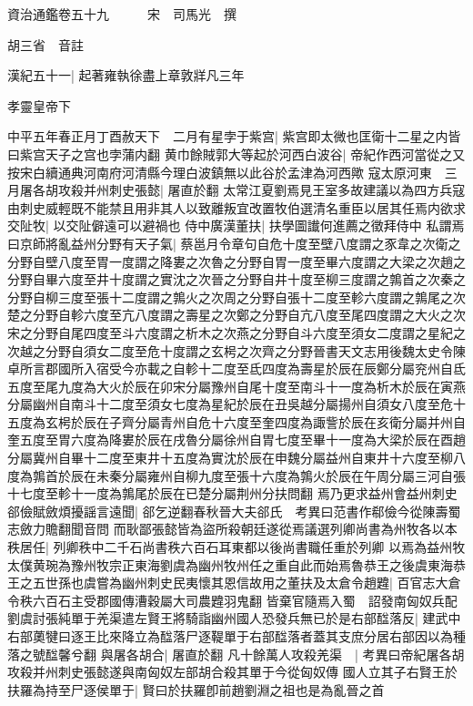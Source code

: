 資治通鑑卷五十九　　　宋　司馬光　撰

胡三省　音註

漢紀五十一|{
	起著雍執徐盡上章敦牂凡三年}


孝靈皇帝下

中平五年春正月丁酉赦天下　二月有星孛于紫宫|{
	紫宫即太微也匡衛十二星之内皆曰紫宫天子之宫也孛蒲内翻}
黄巾餘賊郭大等起於河西白波谷|{
	帝紀作西河當從之又按宋白續通典河南府河清縣今理白波鎮無以此谷於孟津為河西歟}
寇太原河東　三月屠各胡攻殺并州刺史張懿|{
	屠直於翻}
太常江夏劉焉見王室多故建議以為四方兵寇由刺史威輕既不能禁且用非其人以致離叛宜改置牧伯選清名重臣以居其任焉内欲求交阯牧|{
	以交阯僻遠可以避禍也}
侍中廣漢董扶|{
	扶學圖䜟何進薦之徵拜侍中}
私謂焉曰京師將亂益州分野有天子氣|{
	蔡邕月令章句自危十度至壁八度謂之豕韋之次衛之分野自壁八度至胃一度謂之降婁之次魯之分野自胃一度至畢六度謂之大梁之次趙之分野自畢六度至井十度謂之實沈之次晉之分野自井十度至柳三度謂之鶉首之次秦之分野自柳三度至張十二度謂之鶉火之次周之分野自張十二度至軫六度謂之鶉尾之次楚之分野自軫六度至亢八度謂之壽星之次鄭之分野自亢八度至尾四度謂之大火之次宋之分野自尾四度至斗六度謂之析木之次燕之分野自斗六度至須女二度謂之星紀之次越之分野自須女二度至危十度謂之玄枵之次齊之分野晉書天文志用後魏太史令陳卓所言郡國所入宿受今亦載之自軫十二度至氐四度為壽星於辰在辰鄭分屬兖州自氐五度至尾九度為大火於辰在卯宋分屬豫州自尾十度至南斗十一度為析木於辰在寅燕分屬幽州自南斗十二度至須女七度為星紀於辰在丑吳越分屬揚州自須女八度至危十五度為玄枵於辰在子齊分屬青州自危十六度至奎四度為諏訾於辰在亥衛分屬并州自奎五度至胃六度為降婁於辰在戌魯分屬徐州自胃七度至畢十一度為大梁於辰在酉趙分屬冀州自畢十二度至東井十五度為實沈於辰在申魏分屬益州自東井十六度至柳八度為鶉首於辰在未秦分屬雍州自柳九度至張十六度為鶉火於辰在午周分屬三河自張十七度至軫十一度為鶉尾於辰在已楚分屬荆州分扶問翻}
焉乃更求益州會益州刺史郤儉賦斂煩擾謡言遠聞|{
	郤乞逆翻春秋晉大夫郤氏　考異曰范書作郗儉今從陳壽蜀志斂力贍翻聞音問}
而耿鄙張懿皆為盜所殺朝廷遂從焉議選列卿尚書為州牧各以本秩居任|{
	列卿秩中二千石尚書秩六百石耳東都以後尚書職任重於列卿}
以焉為益州牧太僕黄琬為豫州牧宗正東海劉虞為幽州牧州任之重自此而始焉魯恭王之後虞東海恭王之五世孫也虞嘗為幽州刺史民夷懷其恩信故用之董扶及太倉令趙韙|{
	百官志大倉令秩六百石主受郡國傳漕穀屬大司農韙羽鬼翻}
皆棄官隨焉入蜀　詔發南匈奴兵配劉虞討張純單于羌渠遣左賢王將騎詣幽州國人恐發兵無已於是右部䤈落反|{
	建武中右部薁犍曰逐王比來降立為䤈落尸逐鞮單于右部䤈落者蓋其支庶分居右部因以為種落之號䤈馨兮翻}
與屠各胡合|{
	屠直於翻}
凡十餘萬人攻殺羌渠　|{
	考異曰帝紀屠各胡攻殺并州刺史張懿遂與南匈奴左部胡合殺其單于今從匈奴傳}
國人立其子右賢王於扶羅為持至尸逐侯單于|{
	賢曰於扶羅卽前趙劉淵之祖也是為亂晉之首}
